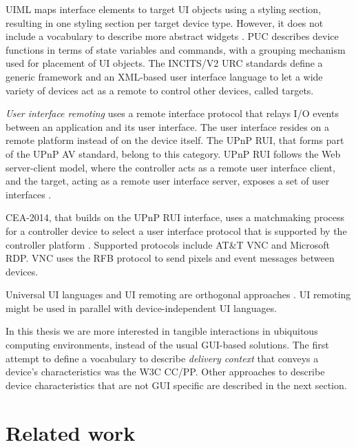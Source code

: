 \ac{UIML} maps interface elements to target UI objects using a styling section, resulting in one styling section per target device type. However, it does not include a vocabulary to describe more abstract widgets \cite{Zimmermann2007}. \ac{PUC} describes device functions in terms of state variables and commands, with a grouping mechanism used for placement of UI objects. The \ac{INCITS/V2 URC} standards define a generic framework and an XML-based user interface language to let a wide variety of devices act as a remote to control other devices, called targets.

\emph{User interface remoting} uses a remote interface protocol that relays I/O events between an application and its user interface. The user interface resides on a remote platform instead of on the device itself. The \ac{UPnP} \ac{RUI}, that forms part of the \ac{UPnP} AV standard,  belong to this category. \ac{UPnP} \ac{RUI} follows the Web server-client model, where the controller acts as a remote user interface client, and the target, acting as a remote user interface server, exposes a set of user interfaces \cite{UPnPForum}.

CEA-2014, that builds on the \ac{UPnP} \ac{RUI} interface, uses a matchmaking process for a controller device to select a user interface protocol that is supported by the controller platform \cite{Zimmermann2007}. Supported protocols include AT\&T \ac{VNC} and Microsoft \ac{RDP}. \ac{VNC} uses the \ac{RFB} protocol to send pixels and event messages between devices.


Universal UI languages and UI remoting are orthogonal approaches \cite{Lee2006}. UI remoting might be used in parallel with device-independent UI languages.


In this thesis we are more interested in tangible interactions in ubiquitous computing environments, instead of the usual \ac{GUI}-based solutions. The first attempt to define a vocabulary to describe \emph{delivery context} that conveys a device's characteristics was the W3C \ac{CC/PP}. Other approaches to describe device characteristics that are not {GUI} specific are described in the next section.

\section{Related work}

